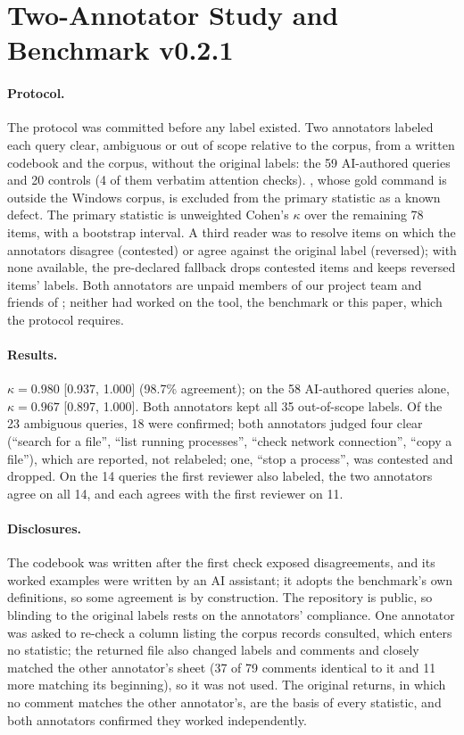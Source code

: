 \section{Two-Annotator Study and Benchmark v0.2.1}
\label{app:labels}

\paragraph{Protocol.} The protocol was committed before any label existed. Two annotators labeled each query clear,
ambiguous or out of scope relative to the corpus, from a written codebook and the corpus, without the original
labels: the 59 AI-authored queries and 20 controls (4 of them verbatim attention checks). , whose gold
command is outside the Windows corpus, is excluded from the primary statistic as a known defect. The primary
statistic is unweighted Cohen's $\kappa$ over the remaining 78 items, with a bootstrap interval. A third reader was
to resolve items on which the annotators disagree (contested) or agree against the original label (reversed); with
none available, the pre-declared fallback drops contested items and keeps reversed items' labels. Both annotators
are unpaid members of our project team and friends of \authorrel{}; neither had worked on the tool, the benchmark or
this paper, which the protocol requires.

\paragraph{Results.} $\kappa=0.980$ [0.937, 1.000] (98.7\% agreement); on the 58 AI-authored queries alone,
$\kappa=0.967$ [0.897, 1.000]. Both annotators kept all 35 out-of-scope labels. Of the 23 ambiguous queries, 18
were confirmed; both annotators judged four clear (``search for a file'', ``list running processes'', ``check
network connection'', ``copy a file''), which are reported, not relabeled; one, ``stop a process'', was contested
and dropped. On the 14 queries the first reviewer also labeled, the two annotators agree on all 14, and each
agrees with the first reviewer on 11.

\paragraph{Disclosures.} The codebook was written after the first check exposed disagreements, and its worked
examples were written by an AI assistant; it adopts the benchmark's own definitions, so some agreement is by
construction. The repository is public, so blinding to the original labels rests on the annotators' compliance.
One annotator was asked to re-check a column listing the
corpus records consulted, which enters no statistic; the returned file also changed labels and comments and
closely matched the other annotator's sheet (37 of 79 comments identical to it and 11 more matching its
beginning), so it was not used. The original returns, in which no comment matches the other annotator's, are the
basis of every statistic, and both annotators confirmed they worked independently.


